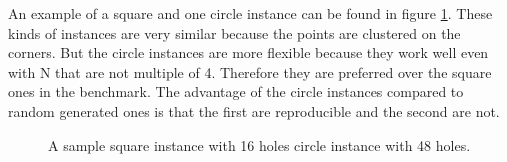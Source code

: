 An example of a square and one circle instance can be found in figure \ref{fig:square_circle}.
These kinds of instances are very similar because the
points are clustered on the corners.
But the circle instances are more flexible because they work well even with N that are not multiple of 4. Therefore they are preferred
over the square ones in the benchmark.
The advantage of the circle instances compared to random generated ones is that the first are reproducible and the second are not.


\begin{figure}[h!]
	\centering
	\caption{A sample square instance with 16 holes circle instance with 48 holes.}
	\label{fig:square_circle}
\end{figure}